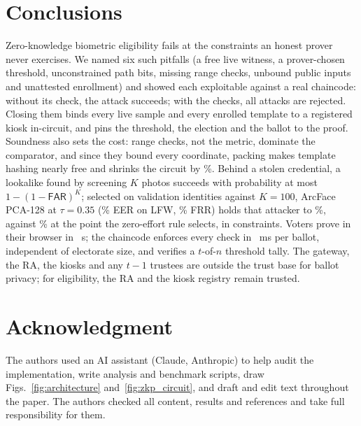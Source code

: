\documentclass[10pt,letterpaper,journal]{IEEEtran}
\begin{document}
\section{Conclusions}
\label{sec:conclusions}
Zero-knowledge biometric eligibility fails at the constraints an honest prover never exercises. We named six such pitfalls (a free live witness, a prover-chosen threshold, unconstrained path bits, missing range checks, unbound public inputs and unattested enrollment) and showed each exploitable against a real chaincode: without its check, the attack succeeds; with the checks, all \nAttacks{} attacks are rejected. Closing them binds every live sample and every enrolled template to a registered kiosk in-circuit, and pins the threshold, the election and the ballot to the proof. Soundness also sets the cost: range checks, not the metric, dominate the comparator, and since they bound every coordinate, packing makes template hashing nearly free and shrinks the circuit by \nPackSave\%. Behind a stolen credential, a lookalike found by screening $K$ photos succeeds with probability at most $1-(1-\mathsf{FAR})^K$; selected on validation identities against $K = 100$, ArcFace PCA-128 at $\tau = 0.35$ (\nLfwEer\% EER on LFW, \nFrr\% FRR) holds that attacker to \nLookLfwHundred\%, against \nZeLookLfwHundred\% at the point the zero-effort rule selects, in \nFaceConstraints{} constraints. Voters prove in their browser in \nBrowserClientS~s; the chaincode enforces every check in \nCastVoteMs~ms per ballot, independent of electorate size, and verifies a $t$-of-$n$ threshold tally. The gateway, the RA, the kiosks and any $t-1$ trustees are outside the trust base for ballot privacy; for eligibility, the RA and the kiosk registry remain trusted.

\section*{Acknowledgment}
The authors used an AI assistant (Claude, Anthropic) to help audit the implementation, write analysis and benchmark scripts, draw Figs.~\ref{fig:architecture} and~\ref{fig:zkp_circuit}, and draft and edit text throughout the paper. The authors checked all content, results and references and take full responsibility for them.



\end{document}
